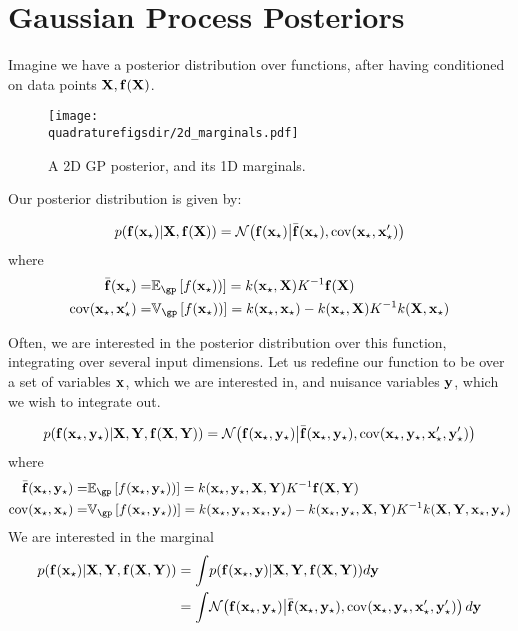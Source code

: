 



\section{Gaussian Process Posteriors}

Imagine we have a \gp{} posterior distribution over functions, after having conditioned on data points ${\mathbf{X}, {\bf{f}}(\mathbf{X})}$.

\begin{figure}[h!]
\centering
\texttt{[image: \\quadraturefigsdir/2d\_marginals.pdf]}
\caption{A 2D GP posterior, and its 1D marginals.}
\label{fig:marginals}
\end{figure}

Our posterior distribution is given by:

\begin{align}
p({\bf{f}}({\bf{x}}_\star)|\mathbf{X}, {\bf{f}}(\mathbf{X})) = \mathcal{N}\!\left({\bf{f}}({\bf{x}}_\star) \middle| \bar{{\bf{f}}}({\bf{x}}_\star),\operatorname{cov}({\bf{x}}_\star,{\bf{x}}_\star')\right)
\end{align} 
where
\begin{align}
\mf(\vx\st) = & \expect_\gp \left[ f(\vx\st))\right] = k(\vx\st, \vX) K^{-1} \vf(\vX) \\
\cov(\vx\st, \vx\st') = & \variance_\gp \left[ f(\vx\st))\right] = k(\vx\st,\vx\st) - k(\vx\st, \vX) K^{-1} k(\vX, \vx\st)
\end{align} 

Often, we are interested in the posterior distribution over this function, integrating over several input dimensions.  Let us redefine our function to be over a set of variables ${\bf{x}}$, which we are interested in, and nuisance variables ${\bf{y}}$, which we wish to integrate out.


\begin{align}
p({\bf{f}}({\bf{x}}_\star, {\bf{y}}_\star)|\mathbf{X}, \mathbf{Y}, {\bf{f}}(\mathbf{X}, \mathbf{Y})) = \mathcal{N}\!\left({\bf{f}}({\bf{x}}_\star, {\bf{y}}_\star) \middle| \bar{{\bf{f}}}({\bf{x}}_\star, {\bf{y}}_\star),\operatorname{cov}({\bf{x}}_\star, {\bf{y}}_\star,{\bf{x}}_\star', {\bf{y}}_\star')\right)
\end{align} 
where
\begin{align}
\mf(\vx\st, \vy\st) = & \expect_\gp \left[ f(\vx\st, \vy\st))\right] = k(\vx\st, \vy\st, \vX, \vY) K^{-1} \vf(\vX, \vY) \\
\cov(\vx\st, \vx\st) = & \variance_\gp \left[ f(\vx\st, \vy\st))\right] = k(\vx\st, \vy\st, \vx\st, \vy\st) - k(\vx\st, \vy\st, \vX, \vY) K^{-1} k(\vX, \vY, \vx\st, \vy\st)
\end{align} 
We are interested in the marginal
\begin{align}
p({\bf{f}}({\bf{x}}_\star)|\mathbf{X}, \mathbf{Y}, {\bf{f}}(\mathbf{X}, \mathbf{Y})) & = \int\! p({\bf{f}}({\bf{x}}_\star, {\bf{y}})|\mathbf{X}, \mathbf{Y}, {\bf{f}}(\mathbf{X}, \mathbf{Y})) d{\bf{y}} \\
& = \int\! \mathcal{N}\!\left({\bf{f}}({\bf{x}}_\star, {\bf{y}}_\star) \middle| \bar{{\bf{f}}}({\bf{x}}_\star, {\bf{y}}_\star),\operatorname{cov}({\bf{x}}_\star, {\bf{y}}_\star,{\bf{x}}_\star', {\bf{y}}_\star')\right) d{\bf{y}}
\end{align} 

